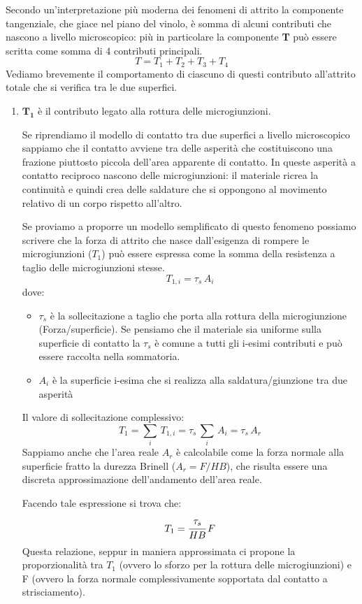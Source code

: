 Secondo un'interpretazione più moderna dei fenomeni di attrito la componente tangenziale, che giace nel piano del vinolo, è somma di alcuni contributi che nascono a livello microscopico: più in particolare la componente \textbf{T} può essere scritta come somma di 4 contributi principali.
\[T = T_1 + T_2 + T_3 + T_4\]
Vediamo brevemente il comportamento di ciascuno di questi contributo all'attrito totale che si verifica tra le due superfici.
\begin{enumerate}
\item $\mathbf{T_1}$ è il contributo legato alla rottura delle microgiunzioni.

Se riprendiamo il modello di contatto tra due superfici a livello microscopico sappiamo che il contatto avviene tra delle asperità che costituiscono una frazione piuttosto piccola dell'area apparente di contatto. In queste asperità a contatto reciproco nascono delle microgiunzioni: il materiale ricrea la continuità e quindi crea delle saldature che si oppongono al movimento relativo di un corpo rispetto all'altro.

Se proviamo a proporre un modello semplificato di questo fenomeno possiamo scrivere che la forza di attrito che nasce dall'esigenza di rompere le microgiunzioni ($T_1$) può essere espressa come la somma della resistenza a taglio delle microgiunzioni stesse.
\[T_{1,i} = \tau_s\,A_i\]
dove:
\begin{itemize}
\item $\tau_s$ è la sollecitazione a taglio che porta alla rottura della microgiunzione (Forza/superficie). Se pensiamo che il materiale sia uniforme sulla superficie di contatto la $\tau_s$ è comune a tutti gli i-esimi contributi e può essere raccolta nella sommatoria.
\item $A_i$ è la superficie i-esima che si realizza alla saldatura/giunzione tra due asperità
\end{itemize}
Il valore di sollecitazione complessivo:
\[T_1 = \sum_i\,T_{1,i} = \tau_s\,\sum_i\,A_i = \tau_s\,A_r\]
Sappiamo anche che l'area reale $A_r$ è calcolabile come la forza normale alla superficie fratto la durezza Brinell ($A_r = F / HB$), che risulta essere una discreta approssimazione dell'andamento dell'area reale.

Facendo tale espressione si trova che:
\[T_1 = \cfrac{\tau_s}{HB}\,F\]
Questa relazione, seppur in maniera approssimata ci propone la proporzionalità tra $T_1$ (ovvero lo sforzo per la rottura delle microgiunzioni) e F (ovvero la forza normale complessivamente sopportata dal contatto a strisciamento).


\end{enumerate}
